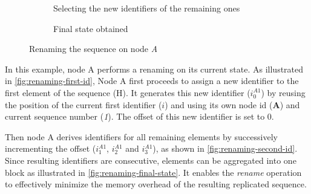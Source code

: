\documentclass[sigplan,10pt]{acmart}
\newcommand{\trm}[1]{\mathit{#1}}
\newcommand{\id}[3]{$\trm{#1}^{\trm{#2}}_{\trm{#3}}$}
\newcommand{\epoch}[1]{$\varepsilon_{#1}$}
\newcommand{\widthletter}{2em}
\newcommand{\widthoriginepoch}{1.65em}
\newcommand{\widthepoch}{1.8em}
\begin{document}
\begin{figure}[ht!]
\begin{subfigure}{\columnwidth}
            \caption{Selecting the new identifiers of the remaining ones}
        \label{fig:renaming-second-id}
    \end{subfigure}
    \begin{subfigure}{\columnwidth}
        \centering
        \caption{Final state obtained}
        \label{fig:renaming-final-state}
    \end{subfigure}
    \caption{Renaming the sequence on node \emph{A}}
    \label{fig:renaming}
\end{figure}

In this example, node A performs a renaming on its current state.
As illustrated in \autoref{fig:renaming-first-id}, Node A first proceeds to assign a new identifier to the first element of the sequence (H).
It generates this new identifier (\id{i}{A1}{0}) by reusing the position of the current first identifier ($i$) and using its own node id (\textbf{A}) and current sequence number (\emph{1}).
The offset of this new identifier is set to 0.

Then node A derives identifiers for all remaining elements by successively incrementing the offset (\id{i}{A1}{1}, \id{i}{A1}{2} and \id{i}{A1}{3}), as shown in \autoref{fig:renaming-second-id}.
Since resulting identifiers are consecutive, elements can be aggregated into one block as illustrated in \autoref{fig:renaming-final-state}.
It enables the \emph{rename} operation to effectively minimize the memory overhead of the resulting replicated sequence.
\end{document}

